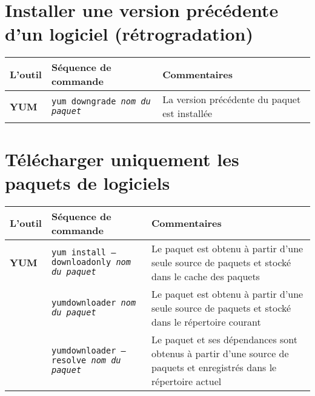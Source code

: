 \documentclass[10pt,a4paper]{article}
\newcommand{\tabellenkopf}{
  \textbf{L'outil} & \textbf{Séquence de commande} & \textbf{Commentaires} \\
}
\begin{document}
\section{Installer une version précédente d'un logiciel (rétrogradation)}
\begin{tabular}{ p{3.5cm} p{9cm} p{11cm}}
  \hline
  \rowcolor{Gray}
  \tabellenkopf
  \hline 
  \textbf{YUM} & \texttt{yum downgrade \textit{nom du paquet}} & La version précédente du paquet est installée \\
  \hline
\end{tabular}

\newpage

\cheatsheet

\section{Télécharger uniquement les paquets de logiciels}
\begin{tabular}{ p{3.5cm} p{9cm} p{11cm}}
  \hline
  \rowcolor{Gray}
  \tabellenkopf
  \hline 
  \textbf{YUM} & \texttt{yum install --downloadonly \textit{nom du paquet}} & Le paquet est obtenu à partir d'une seule source de paquets et stocké dans le cache des paquets\\
  \rowcolor{Gray}
  & \texttt{yumdownloader \textit{nom du paquet}} & Le paquet est obtenu à partir d'une seule source de paquets et stocké dans le répertoire courant\\
  & \texttt{yumdownloader --resolve \textit{nom du paquet}} & Le paquet et ses dépendances sont obtenus à partir d'une source de paquets et enregistrés dans le répertoire actuel\\
  \hline
\end{tabular}
\end{document}
